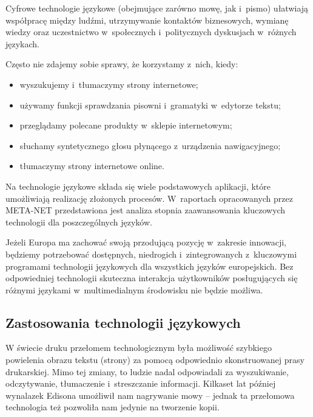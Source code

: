 \begin{multicols}{2}
Cyfrowe technologie językowe (obejmujące zarówno mowę, jak
i~pismo) ułatwiają współpracę między ludźmi, utrzymywanie
kontaktów biznesowych, wymianę wiedzy oraz uczestnictwo
w~społecznych i~politycznych dyskusjach w~różnych językach. 

Często nie zdajemy sobie sprawy, że korzystamy z~nich, kiedy:
\begin{itemize} \item wyszukujemy i~tłumaczymy strony internetowe;
\item używamy funkcji sprawdzania pisowni i~gramatyki w~edytorze
tekstu; \item przeglądamy polecane produkty w~sklepie internetowym;
\item słuchamy syntetycznego głosu płynącego z~urządzenia
nawigacyjnego; \item tłumaczymy strony internetowe online.
\end{itemize} 

Na technologie językowe składa się wiele podstawowych aplikacji,
które umożliwiają realizację złożonych procesów. W~raportach
opracowanych przez META-NET przedstawiona jest analiza stopnia
zaawansowania kluczowych technologii dla poszczególnych języków. 


Jeżeli Europa ma zachować swoją przodującą pozycję w~zakresie
innowacji, będziemy potrzebować dostępnych, niedrogich
i~zintegrowanych z~kluczowymi programami technologii językowych dla
wszystkich języków europejskich. Bez odpowiedniej technologii
skuteczna interakcja użytkowników posługujących się różnymi
językami w~multimedialnym środowisku nie będzie możliwa. 

\subsection{Zastosowania technologii językowych} 

W świecie druku przełomem technologicznym była możliwość
szybkiego powielenia obrazu tekstu (strony) za pomocą odpowiednio
skonstruowanej prasy drukarskiej. Mimo tej zmiany, to ludzie nadal
odpowiadali za wyszukiwanie, odczytywanie, tłumaczenie i~streszczanie
informacji. Kilkaset lat później wynalazek Edisona umożliwił nam
nagrywanie mowy – jednak ta przełomowa technologia też pozwoliła
nam jedynie na tworzenie kopii. 



\end{multicols}

